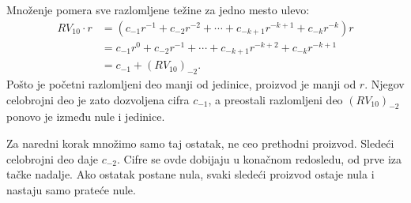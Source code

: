
Množenje pomera sve razlomljene težine za jedno mesto ulevo:
\[\begin{aligned}
RV_{10}\cdot r
&=(c_{-1}r^{-1}+c_{-2}r^{-2}+\cdots+c_{-k+1}r^{-k+1}+c_{-k}r^{-k})r\\
&=c_{-1}r^0+c_{-2}r^{-1}+\cdots+c_{-k+1}r^{-k+2}+c_{-k}r^{-k+1}\\
&=c_{-1}+(RV_{10})_{-2}.
\end{aligned}\]
Pošto je početni razlomljeni deo manji od jedinice, proizvod je manji od $r$. Njegov celobrojni deo je zato dozvoljena cifra $c_{-1}$, a preostali razlomljeni deo $(RV_{10})_{-2}$ ponovo je između nule i jedinice.

Za naredni korak množimo samo taj ostatak, ne ceo prethodni proizvod. Sledeći celobrojni deo daje $c_{-2}$. Cifre se ovde dobijaju u konačnom redosledu, od prve iza tačke nadalje. Ako ostatak postane nula, svaki sledeći proizvod ostaje nula i nastaju samo prateće nule.
